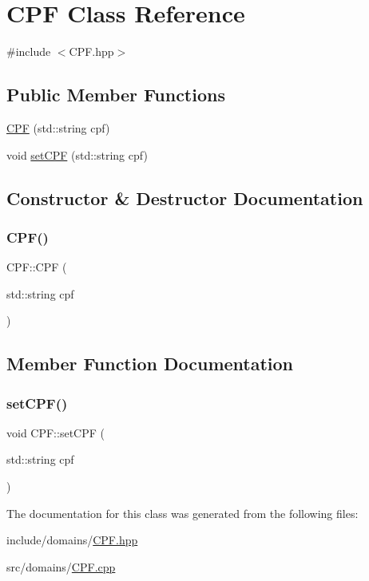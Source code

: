 \hypertarget{class_c_p_f}{}\section{C\+PF Class Reference}
\label{class_c_p_f}


{\ttfamily \#include $<$C\+P\+F.\+hpp$>$}

\subsection*{Public Member Functions}
\begin{DoxyCompactItemize}
\item 
\mbox{\hyperlink{class_c_p_f_ae6d429bd44c42bdbad7835b38bfe1639}{C\+PF}} (std\+::string cpf)
\item 
void \mbox{\hyperlink{class_c_p_f_a13881eec59b8edf78e9b99ab5cecd2e5}{set\+C\+PF}} (std\+::string cpf)
\end{DoxyCompactItemize}


\subsection{Constructor \& Destructor Documentation}
\mbox{\label{class_c_p_f_ae6d429bd44c42bdbad7835b38bfe1639}} 
\subsubsection{\texorpdfstring{CPF()}{CPF()}}
{\footnotesize\ttfamily C\+P\+F\+::\+C\+PF (\begin{DoxyParamCaption}\item[{std\+::string}]{cpf }\end{DoxyParamCaption})}



\subsection{Member Function Documentation}
\mbox{\label{class_c_p_f_a13881eec59b8edf78e9b99ab5cecd2e5}} 
\subsubsection{\texorpdfstring{setCPF()}{setCPF()}}
{\footnotesize\ttfamily void C\+P\+F\+::set\+C\+PF (\begin{DoxyParamCaption}\item[{std\+::string}]{cpf }\end{DoxyParamCaption})}



The documentation for this class was generated from the following files\+:\begin{DoxyCompactItemize}
\item 
include/domains/\mbox{\hyperlink{_c_p_f_8hpp}{C\+P\+F.\+hpp}}\item 
src/domains/\mbox{\hyperlink{_c_p_f_8cpp}{C\+P\+F.\+cpp}}\end{DoxyCompactItemize}
